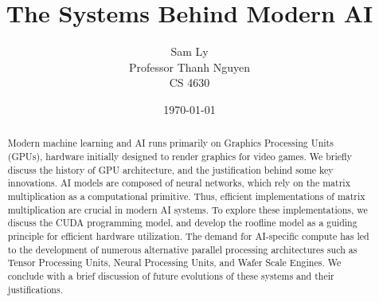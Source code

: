 \documentclass{article}
\title{The Systems Behind Modern AI}
\author{
  Sam Ly \\
  Professor Thanh Nguyen \\
  CS 4630
}
\date{\today}
\begin{document}
\maketitle

\begin{abstract}
  Modern machine learning and AI runs primarily on Graphics Processing Units (GPUs),
  hardware initially designed to render graphics for video games. We briefly
  discuss the history of GPU architecture, and the justification behind some key innovations.
  AI models are composed of neural networks, which rely on the matrix multiplication as
  a computational primitive.
  Thus, efficient implementations of matrix multiplication are crucial in modern
  AI systems.
  To explore these implementations, we discuss the CUDA programming model,
  and develop the roofline model as a guiding principle for efficient hardware utilization.
  The demand for AI-specific compute has led to the development of numerous
  alternative parallel processing architectures such as Tensor Processing Units,
  Neural Processing Units, and Wafer Scale Engines.
  We conclude with a brief discussion of future evolutions of these systems and
  their justifications.
\end{abstract}
\end{document}
